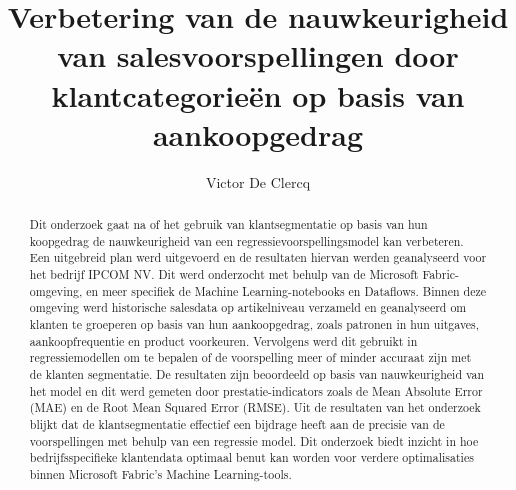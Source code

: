 \documentclass{hogent-article}
\title{Verbetering van de nauwkeurigheid van salesvoorspellingen door klantcategorieën op basis van aankoopgedrag}
\author{Victor De Clercq}
\begin{document}
\begin{abstract}

Dit onderzoek gaat na of het gebruik van klantsegmentatie op basis van hun koopgedrag de nauwkeurigheid van een regressievoorspellingsmodel kan verbeteren. Een uitgebreid plan werd uitgevoerd en de resultaten hiervan werden geanalyseerd voor het bedrijf IPCOM NV. Dit werd onderzocht met behulp van de Microsoft Fabric-omgeving, en meer specifiek de Machine Learning-notebooks en Dataflows. Binnen deze omgeving werd historische salesdata op artikelniveau verzameld en geanalyseerd om klanten te groeperen op basis van hun aankoopgedrag, zoals patronen in hun uitgaves, aankoopfrequentie en product voorkeuren. Vervolgens werd dit gebruikt in regressiemodellen om te bepalen of de voorspelling meer of minder accuraat zijn met de klanten segmentatie. De resultaten zijn beoordeeld op basis van nauwkeurigheid van het model en dit werd gemeten door prestatie-indicators zoals de Mean Absolute Error (MAE) en de Root Mean Squared Error (RMSE). Uit de resultaten van het onderzoek blijkt dat de klantsegmentatie effectief een bijdrage heeft aan de precisie van de voorspellingen met behulp van een regressie model. Dit onderzoek biedt inzicht in hoe bedrijfsspecifieke klantendata optimaal benut kan worden voor verdere optimalisaties binnen Microsoft Fabric’s Machine Learning-tools. 


\end{abstract}

\tableofcontents



\printbibliography[heading=bibintoc]
\end{document}
